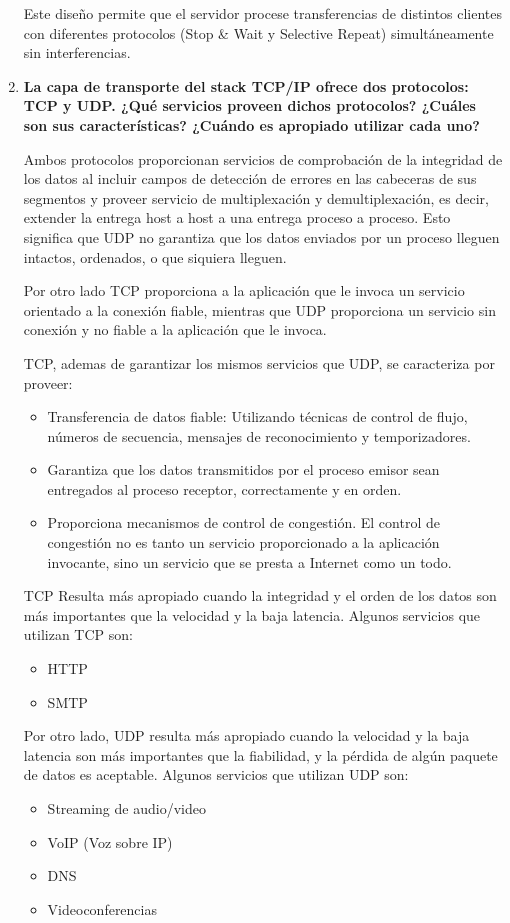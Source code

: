 \begin{enumerate}
    Este diseño permite que el servidor procese transferencias de distintos clientes con diferentes protocolos (Stop \& Wait y Selective Repeat) simultáneamente sin interferencias.
    
    
    \item \textbf{La capa de transporte del stack TCP/IP ofrece dos protocolos: TCP y UDP. ¿Qué servicios proveen dichos protocolos? ¿Cuáles son sus características? ¿Cuándo es apropiado utilizar cada uno?}

    Ambos protocolos proporcionan servicios de comprobación de la integridad de los datos al incluir campos de detección de errores en las cabeceras de sus segmentos y proveer servicio de multiplexación y demultiplexación, es decir, extender la entrega host a host a una entrega proceso a proceso.
    Esto significa que UDP no garantiza que los datos enviados por un proceso lleguen intactos, ordenados, o que siquiera lleguen.

    Por otro lado TCP proporciona a la aplicación que le invoca un servicio orientado a la conexión fiable, mientras que UDP proporciona un servicio sin conexión y no fiable a la aplicación que le invoca.

    TCP, ademas de garantizar los mismos servicios que UDP, se caracteriza por proveer:
    \begin{itemize} 
        \item Transferencia de datos fiable:
         Utilizando técnicas de control de flujo, números de secuencia, mensajes de reconocimiento y temporizadores.
        \item Garantiza que los datos transmitidos por el proceso emisor sean entregados al proceso receptor, correctamente y en orden. 
        \item Proporciona mecanismos de control de congestión. El control de congestión no es tanto un servicio proporcionado a la aplicación invocante, sino un servicio que se presta a Internet como un todo.
    \end{itemize}

    TCP Resulta más apropiado cuando la integridad y el orden de los datos son más importantes que la velocidad y la baja latencia. Algunos servicios que utilizan TCP son:
    \begin{itemize}
        \item HTTP
        \item SMTP
    \end{itemize}

    Por otro lado, UDP resulta más apropiado cuando la velocidad y la baja latencia son más importantes que la fiabilidad, y la pérdida de algún paquete de datos es aceptable. Algunos servicios que utilizan UDP son:
    \begin{itemize}
        \item Streaming de audio/video
        \item VoIP (Voz sobre IP)
        \item DNS
        \item Videoconferencias
    \end{itemize}



\end{enumerate}

